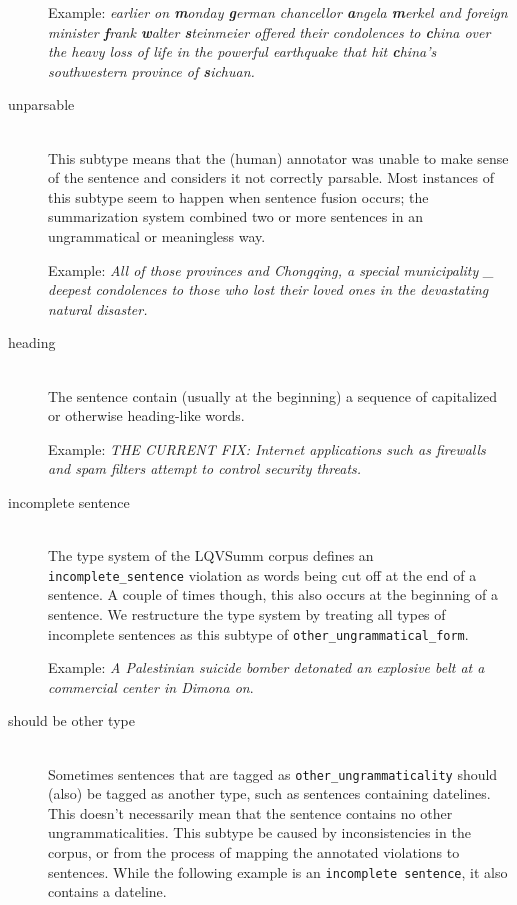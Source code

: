\documentclass[a4paper,10pt]{scrartcl}
\theoremstyle{style}
\begin{document}
\begin{description}
	Example: \textit{earlier on \textbf{m}onday \textbf{g}erman chancellor \textbf{a}ngela \textbf{m}erkel and foreign \\minister \textbf{f}rank \textbf{w}alter \textbf{s}teinmeier offered their condolences to \textbf{c}hina over the heavy loss of life in the powerful earthquake that hit \textbf{c}hina's southwestern province of \textbf{s}ichuan.}

\item[unparsable]\hfill \\
	This subtype means that the (human) annotator was unable to make sense of the sentence and considers it not correctly parsable. Most instances of this subtype seem to happen when sentence fusion occurs; the summarization system combined two or more sentences in an ungrammatical or meaningless way.

	Example: \textit{All of those provinces and Chongqing, a special municipality \_ deepest condolences to those who lost their loved ones in the devastating natural disaster.}

\item[heading] \hfill \\
	The sentence contain (usually at the beginning) a sequence of capitalized or otherwise heading-like words. %

	Example: \textit{THE CURRENT FIX: Internet applications such as firewalls and spam filters attempt to control security threats.}

\item[incomplete sentence] \hfill \\
	The type system of the LQVSumm corpus \citep{valeeva} defines an \texttt{incomplete\_sentence} violation as words being cut off at the end of a sentence. A couple of times though, this also occurs at the beginning of a sentence. We restructure the type system by treating all types of incomplete sentences as this subtype of \texttt{other\_ungrammatical\_form}.

	Example: \textit{A Palestinian suicide bomber detonated an explosive belt at a \\commercial center in Dimona on}.
\item[should be other type] \hfill \\
	Sometimes sentences that are tagged as \texttt{other\_ungrammaticality} should (also) be tagged as another type, such as sentences containing datelines. This doesn't necessarily mean that the sentence contains no other ungrammaticalities. This subtype be caused by inconsistencies in the corpus, or from the process of mapping the annotated violations to sentences. While the following example is an \texttt{incomplete sentence}, it also contains a dateline.


\end{description}
\end{document}
